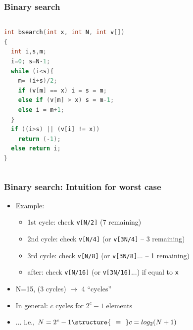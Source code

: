 \documentclass[aspectratio=169]{beamer}
\begin{document}
\begin{frame}[fragile]\frametitle{Binary search}
\begin{columns}
\begin{column}{0.48\textwidth}
\begin{lstlisting}[language=C++,emph={bsearch}]
int bsearch(int x, int N, int v[])
{
  int i,s,m;
  i=0; s=N-1;
  while (i<s){
    m= (i+s)/2;
    if (v[m] == x) i = s = m;
    else if (v[m] > x) s = m-1;
    else i = m+1;
  }
  if ((i>s) || (v[i] != x))
    return (-1);
  else return i;
}
\end{lstlisting}
\end{column}
\begin{column}{0.48\textwidth}
\end{column}
\end{columns}
\end{frame}

\begin{frame}\frametitle{Binary search: Intuition for worst case}    
  \begin{itemize}
    \item Example: 
    \begin{itemize}
      \item \alert{1st cycle:} check \texttt{v[N/2]} (7 remaining)
      \item \alert{2nd cycle:} check \texttt{v[N/4]} (or \texttt{v[3N/4]} -- 3 remaining)
      \item \alert{3rd cycle:} check \texttt{v[N/8]} (or \texttt{v[3N/8]}... -- 1 remaining)
      \item \alert{after:} check \texttt{v[N/16]} (or \texttt{v[3N/16]}...) if equal to \texttt{x}
    \end{itemize}
    \item N=15, (3 cycles) $\to$ 4 ``cycles''
    \item In general: $c$ cycles for $2^c-1$ elements
    \item ... i.e., $N = 2^{c}-1 \structure{~~\equiv~~} c = log_2(N+1)$
  \end{itemize}
\end{frame}
\end{document}
